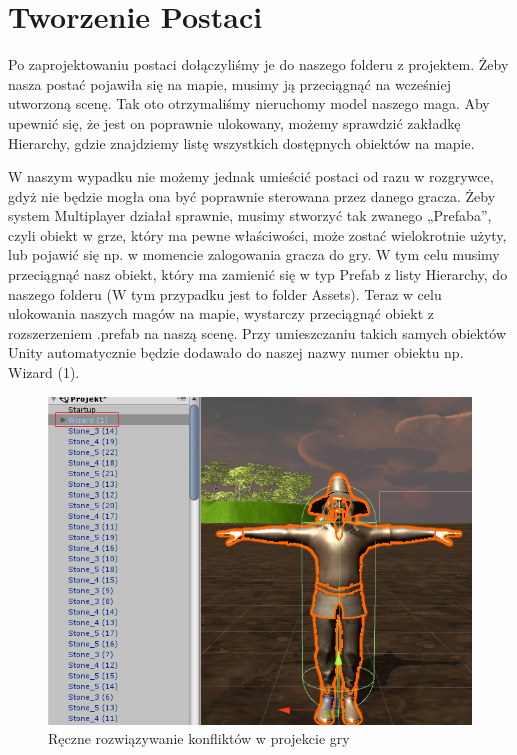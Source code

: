 \documentclass[openright]{xmgr}
\begin{document}
  \section{Tworzenie Postaci}

    Po zaprojektowaniu postaci dołączyliśmy je do naszego folderu z projektem. Żeby nasza postać pojawiła się na mapie, musimy ją przeciągnąć na wcześniej utworzoną scenę. Tak oto otrzymaliśmy nieruchomy model naszego maga. Aby upewnić się, że jest on poprawnie ulokowany, możemy sprawdzić zakładkę Hierarchy, gdzie znajdziemy listę wszystkich dostępnych obiektów na mapie. 

    W naszym wypadku nie możemy jednak umieścić postaci od razu w rozgrywce, gdyż nie będzie mogła ona być poprawnie sterowana przez danego gracza. Żeby system Multiplayer działał sprawnie, musimy stworzyć tak zwanego „Prefaba”, czyli obiekt w grze, który ma pewne właściwości, może zostać wielokrotnie użyty, lub pojawić się np. w momencie zalogowania gracza do gry. W tym celu musimy przeciągnąć nasz obiekt, który ma zamienić się w typ Prefab z listy Hierarchy, do naszego folderu (W tym przypadku jest to folder Assets). Teraz w celu ulokowania naszych magów na mapie, wystarczy przeciągnąć obiekt z rozszerzeniem .prefab na naszą scenę. Przy umieszczaniu takich samych obiektów Unity automatycznie będzie dodawało do naszej nazwy numer obiektu np. Wizard (1). 

    \begin{figure}[H]
      \center
      \includegraphics[width=\textwidth]{prefab.png}
      \caption{Ręczne rozwiązywanie konfliktów w projekcie gry}
    \end{figure}
\end{document}

